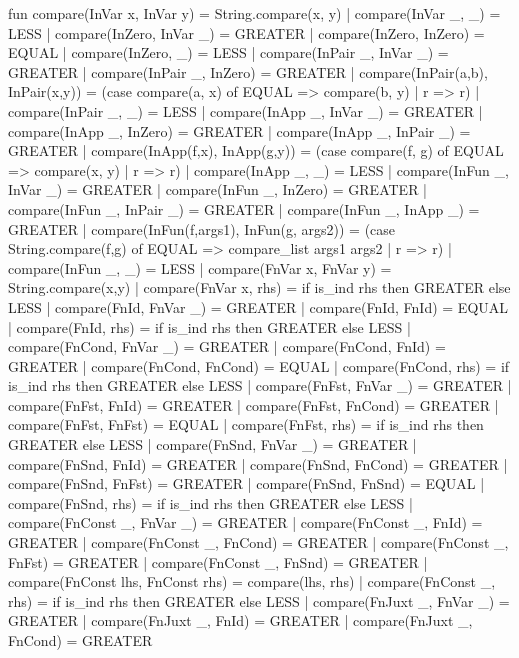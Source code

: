 \nwenddocs{}\endmoddef\nwstartdeflinemarkup{}\nwenddeflinemarkup
fun compare(InVar x, InVar y) = String.compare(x, y)
  | compare(InVar _, _) = LESS
  | compare(InZero, InVar _) = GREATER
  | compare(InZero, InZero) = EQUAL
  | compare(InZero, _) = LESS
  | compare(InPair _, InVar _) = GREATER
  | compare(InPair _, InZero) = GREATER
  | compare(InPair(a,b), InPair(x,y)) =
     (case compare(a, x) of
       EQUAL => compare(b, y)
     | r => r)
  | compare(InPair _, _) = LESS
  | compare(InApp _, InVar _) = GREATER
  | compare(InApp _, InZero) = GREATER
  | compare(InApp _, InPair _) = GREATER
  | compare(InApp(f,x), InApp(g,y)) =
     (case compare(f, g) of
       EQUAL => compare(x, y)
     | r => r)
  | compare(InApp _, _) = LESS
  | compare(InFun _, InVar _) = GREATER
  | compare(InFun _, InZero) = GREATER
  | compare(InFun _, InPair _) = GREATER
  | compare(InFun _, InApp _) = GREATER
  | compare(InFun(f,args1), InFun(g, args2)) =
     (case String.compare(f,g) of
       EQUAL => compare_list args1 args2
     | r => r)
  | compare(InFun _, _) = LESS
  | compare(FnVar x, FnVar y) = String.compare(x,y)
  | compare(FnVar x, rhs) = if is_ind rhs then GREATER else LESS
  | compare(FnId, FnVar _) = GREATER
  | compare(FnId, FnId) = EQUAL
  | compare(FnId, rhs) = if is_ind rhs then GREATER else LESS
  | compare(FnCond, FnVar _) = GREATER
  | compare(FnCond, FnId) = GREATER
  | compare(FnCond, FnCond) = EQUAL
  | compare(FnCond, rhs) = if is_ind rhs then GREATER else LESS
  | compare(FnFst, FnVar _) = GREATER
  | compare(FnFst, FnId) = GREATER
  | compare(FnFst, FnCond) = GREATER
  | compare(FnFst, FnFst) = EQUAL
  | compare(FnFst, rhs) = if is_ind rhs then GREATER else LESS
  | compare(FnSnd, FnVar _) = GREATER
  | compare(FnSnd, FnId) = GREATER
  | compare(FnSnd, FnCond) = GREATER
  | compare(FnSnd, FnFst) = GREATER
  | compare(FnSnd, FnSnd) = EQUAL
  | compare(FnSnd, rhs) = if is_ind rhs then GREATER else LESS
  | compare(FnConst _, FnVar _) = GREATER
  | compare(FnConst _, FnId) = GREATER
  | compare(FnConst _, FnCond) = GREATER
  | compare(FnConst _, FnFst) = GREATER
  | compare(FnConst _, FnSnd) = GREATER
  | compare(FnConst lhs, FnConst rhs) = compare(lhs, rhs)
  | compare(FnConst _, rhs) = if is_ind rhs then GREATER else LESS
  | compare(FnJuxt _, FnVar _) = GREATER
  | compare(FnJuxt _, FnId) = GREATER
  | compare(FnJuxt _, FnCond) = GREATER

